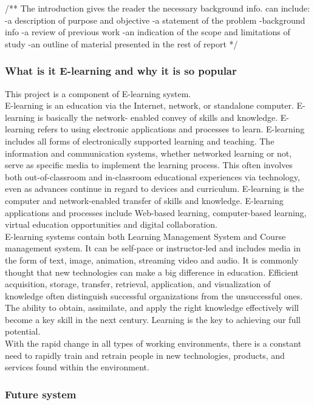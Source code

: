 \documentclass{scrartcl}
\begin{document}
/** The introduction gives the reader the necessary background info. can include:
-a description of purpose and objective
-a statement of the problem
-background info
-a review of previous work
-an indication of the scope and limitations of study
-an outline of material presented in the rest of report
*/ \\
  	\subsubsection{What is it E-learning and why it is so popular}
  	
This project is a component of E-learning system. \\
E-learning is an education via the Internet, network, or standalone computer. E-learning is basically the network- enabled convey of skills and knowledge. E-learning refers to using electronic applications and processes to learn. E-learning includes all forms of electronically supported learning and teaching.
The information and communication systems, whether networked learning or not, serve as specific media to implement the learning process. This often involves both out-of-classroom and in-classroom educational experiences via technology, even as advances continue in regard to devices and curriculum. E-learning is the computer and network-enabled transfer of skills and knowledge. E-learning applications and processes include Web-based learning, computer-based learning, virtual education opportunities and digital collaboration.\\
E-learning systems contain both Learning Management System and Course management system. It can be self-pace or instructor-led and includes media in the form of text, image, animation, streaming video and audio. It is commonly thought that new technologies can make a big difference in education.
Efficient acquisition, storage, transfer, retrieval, application, and visualization of knowledge often distinguish successful organizations from the unsuccessful ones. The ability to obtain, assimilate, and apply the right knowledge effectively will become a key skill in the next century. Learning is the key to achieving our full potential.\\
With the rapid change in all types of working environments, there is a constant need to rapidly train and retrain people in new technologies, products, and services found within the environment.\\
\subsubsection{Future system}
\end{document}

